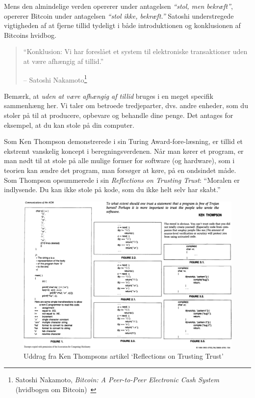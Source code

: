 \documentclass[paper=6in:9in,pagesize=pdftex,
               headinclude=on,footinclude=on,12pt]{scrbook}
\begin{document}
Mens den almindelige verden opererer under antagelsen \textit{\enquote{stol, men bekræft}}, opererer Bitcoin under antagelsen \textit{\enquote{stol ikke, bekræft.}} Satoshi understregede vigtigheden af at fjerne tillid tydeligt i både introduktionen og konklusionen af Bitcoins hvidbog.\begin{quotation}\begin{samepage} \enquote{Konklusion: Vi har foreslået et system til elektroniske transaktioner uden at være afhængig af tillid.} \begin{flushright} -- Satoshi Nakamoto\footnote{Satoshi Nakamoto, \textit{Bitcoin: A Peer-to-Peer Electronic Cash System} (hvidbogen om Bitcoin)~\cite{whitepaper}}
\end{flushright}\end{samepage}\end{quotation}

Bemærk, at \textit{uden at være afhængig af tillid} bruges i en meget specifik sammenhæng her. Vi taler om betroede tredjeparter, dvs. andre enheder, som du stoler på til at producere, opbevare og behandle dine penge. Det antages for eksempel, at du kan stole på din computer.

Som Ken Thompson demonstrerede i sin Turing Award-fore-læsning, er tillid et ekstremt vanskelig koncept i beregningsverdenen. Når man kører et program, er man nødt til at stole på alle mulige former for software (og hardware), som i teorien kan ændre det program, man forsøger at køre, på en ondsindet måde. Som Thompson opsummerede i sin \textit{Reflections on Trusting Trust}: \enquote{Moralen er indlysende. Du kan ikke stole på kode, som du ikke helt selv har skabt.}~\cite{trusting-trust}

\begin{figure}
  \includegraphics{assets/images/ken-thompson-hack.png}
  \caption{Uddrag fra Ken Thompsons artikel `Reflections on Trusting Trust'}
  \label{fig:ken-thompson-hack}
\end{figure}
\end{document}
